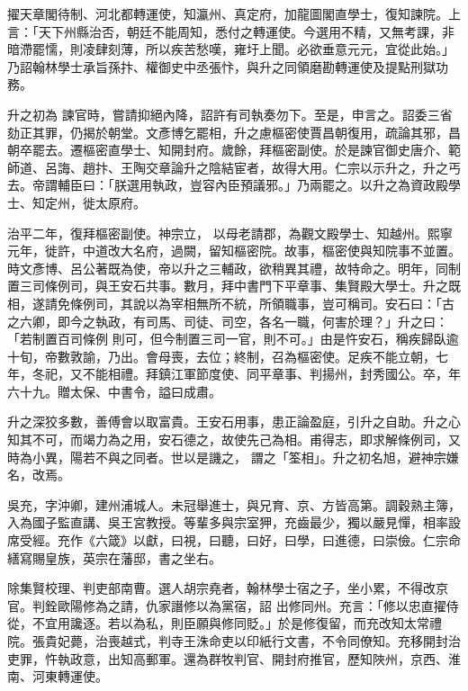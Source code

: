 \begin{pinyinscope}
 擢天章閣待制、河北都轉運使，知瀛州、真定府，加龍圖閣直學士，復知諫院。上言：「天下州縣治否，朝廷不能周知，悉付之轉運使。今選用不精，又無考課，非暗滯罷懦，則凌肆刻薄，所以疾苦愁嘆，雍圩上聞。必欲垂意元元，宜從此始。」乃詔翰林學士承旨孫抃、權御史中丞張忭，與升之同領磨勘轉運使及提點刑獄功務。



 升之初為
 諫官時，嘗請抑絕內降，詔許有司執奏勿下。至是，申言之。詔委三省劾正其罪，仍揭於朝堂。文彥博乞罷相，升之慮樞密使賈昌朝復用，疏論其邪，昌朝卒罷去。遷樞密直學士、知開封府。歲餘，拜樞密副使。於是諫官御史唐介、範師道、呂誨、趙抃、王陶交章論升之陰結宦者，故得大用。仁宗以示升之，升之丐去。帝謂輔臣曰：「朕選用執政，豈容內臣預議邪。」乃兩罷之。以升之為資政殿學士、知定州，徙太原府。



 治平二年，復拜樞密副使。神宗立，
 以母老請郡，為觀文殿學士、知越州。熙寧元年，徙許，中道改大名府，過闕，留知樞密院。故事，樞密使與知院事不並置。時文彥博、呂公著既為使，帝以升之三輔政，欲稍異其禮，故特命之。明年，同制置三司條例司，與王安石共事。數月，拜中書門下平章事、集賢殿大學士。升之既相，遂請免條例司，其說以為宰相無所不統，所領職事，豈可稱司。安石曰：「古之六卿，即今之執政，有司馬、司徒、司空，各名一職，何害於理？」升之曰：「若制置百司條例
 則可，但今制置三司一官，則不可。」由是忤安石，稱疾歸臥逾十旬，帝數敦諭，乃出。會母喪，去位；終制，召為樞密使。足疾不能立朝，七年，冬祀，又不能相禮。拜鎮江軍節度使、同平章事、判揚州，封秀國公。卒，年六十九。贈太保、中書令，謚曰成肅。



 升之深狡多數，善傅會以取富貴。王安石用事，患正論盈庭，引升之自助。升之心知其不可，而竭力為之用，安石德之，故使先己為相。甫得志，即求解條例司，又時為小異，陽若不與之同者。世以是譏之，
 謂之「筌相」。升之初名旭，避神宗嫌名，改焉。



 吳充，字沖卿，建州浦城人。未冠舉進士，與兄育、京、方皆高第。調穀熟主簿，入為國子監直講、吳王宮教授。等輩多與宗室狎，充齒最少，獨以嚴見憚，相率設席受經。充作《六箴》以獻，曰視，曰聽，曰好，曰學，曰進德，曰崇儉。仁宗命繕寫賜皇族，英宗在藩邸，書之坐右。



 除集賢校理、判吏部南曹。選人胡宗堯者，翰林學士宿之子，坐小累，不得改京官。判銓歐陽修為之請，仇家譖修以為黨宿，詔
 出修同州。充言：「修以忠直擢侍從，不宜用讒逐。若以為私，則臣願與修同貶。」於是修復留，而充改知太常禮院。張貴妃薨，治喪越式，判寺王洙命吏以印紙行文書，不令同僚知。充移開封治吏罪，忤執政意，出知高郵軍。還為群牧判官、開封府推官，歷知陜州，京西、淮南、河東轉運使。




\end{pinyinscope}
